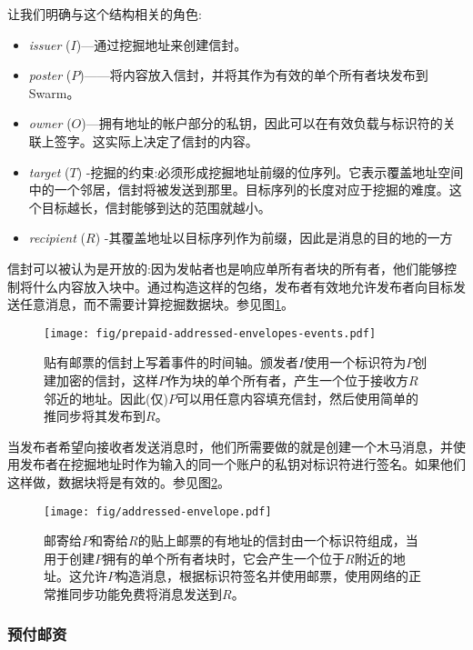 让我们明确与这个结构相关的角色:

\begin{itemize}
\item \emph{issuer} ($I$)—通过挖掘地址来创建信封。 
\item \emph{poster} ($P$)——将内容放入信封，并将其作为有效的单个所有者块发布到Swarm。
\item \emph{owner} ($O$)—拥有地址的帐户部分的私钥，因此可以在有效负载与标识符的关联上签字。这实际上决定了信封的内容。
\item \emph{target} ($T$) -挖掘的约束:必须形成挖掘地址前缀的位序列。它表示覆盖地址空间中的一个邻居，信封将被发送到那里。目标序列的长度对应于挖掘的难度。这个目标越长，信封能够到达的范围就越小。
\item \emph{recipient} ($R$) -其覆盖地址以目标序列作为前缀，因此是消息的目的地的一方
\end{itemize}

信封可以被认为是开放的:因为发帖者也是响应单所有者块的所有者，他们能够控制将什么内容放入块中。通过构造这样的包络，发布者有效地允许发布者向目标发送任意消息，而不需要计算挖掘数据块。参见图\ref{fig:addressed-envelope-events}。 


\begin{figure}[htbp]
   \centering
   \texttt{[image: fig/prepaid-addressed-envelopes-events.pdf]}
   \caption[贴有邮票，写有地址的信封，事件的时间表]{贴有邮票的信封上写着事件的时间轴。颁发者$I$使用一个标识符为$P$创建加密的信封，这样$P$作为块的单个所有者，产生一个位于接收方$R$邻近的地址。因此(仅)$P$可以用任意内容填充信封，然后使用简单的推同步将其发布到$R$。}
   \label{fig:addressed-envelope-events}
\end{figure}

当发布者希望向接收者发送消息时，他们所需要做的就是创建一个木马消息，并使用发布者在挖掘地址时作为输入的同一个账户的私钥对标识符进行签名。如果他们这样做，数据块将是有效的。参见图\ref{fig:addressed-envelope}。


\begin{figure}[htbp]
   \centering
   \texttt{[image: fig/addressed-envelope.pdf]}
   \caption[贴有邮票和地址的信封\statusgreen]{邮寄给$P$和寄给$R$的贴上邮票的有地址的信封由一个标识符组成，当用于创建$P$拥有的单个所有者块时，它会产生一个位于$R$附近的地址。这允许$P$构造消息，根据标识符签名并使用邮票，使用网络的正常推同步功能免费将消息发送到$R$。 }
   \label{fig:addressed-envelope}
\end{figure}

\subsubsection{预付邮资}

